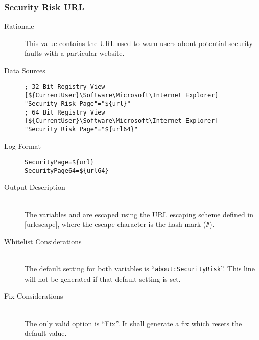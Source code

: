 \subsubsection{Security Risk URL}
\begin{description}
\item[Rationale] This value contains the URL used to warn users about potential
security faults with a particular website.

\item[Data Sources] \hfill
\vspace{-\baselineskip}
\begin{verbatim}
; 32 Bit Registry View
[${CurrentUser}\Software\Microsoft\Internet Explorer]
"Security Risk Page"="${url}"
; 64 Bit Registry View
[${CurrentUser}\Software\Microsoft\Internet Explorer]
"Security Risk Page"="${url64}"
\end{verbatim}
\item[Log Format] \hfill
\vspace{-\baselineskip}
\begin{verbatim} 
SecurityPage=${url}
SecurityPage64=${url64}
\end{verbatim}
\item[Output Description] \hfill \\
The variables  and  are escaped using the URL escaping
scheme defined in \ref{urlescape}, where the escape character is the hash mark
(\verb|#|).
\item[Whitelist Considerations] \hfill \\
The default setting for both variables is ``\verb|about:SecurityRisk|''. This
line will not be generated if that default setting is set.
\item[Fix Considerations] \hfill \\
The only valid option is ``Fix''. It shall generate a fix which resets the
default value.
\end{description}


